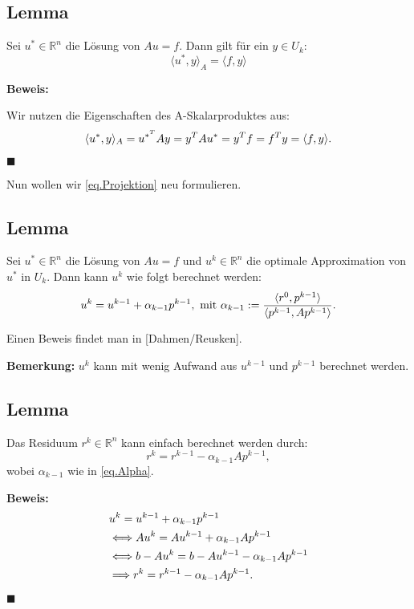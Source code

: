 \subsection{Lemma}
Sei $u^{*} \in \mathbb{R}^{n}$ die Lösung von $Au = f$. Dann gilt für ein $y \in U_{k}$:
\begin{equation}
\langle u^{*}, y \rangle _{A} = \langle f, y \rangle
\end{equation}

\textbf{Beweis:}

Wir nutzen die Eigenschaften des A-Skalarproduktes aus:
\begin{equation}
\langle u^{*}, y \rangle _{A} = u^{{*}^{T}}Ay = y^{T}Au^{*} = y^{T}f = f^{T}y = \langle f, y \rangle. \notag
\end{equation}
\begin{flushright}
$\blacksquare$
\end{flushright}

Nun wollen wir \autoref{eq.Projektion} neu formulieren.

\subsection{Lemma}
Sei $u^{*} \in \mathbb{R}^{n}$ die Lösung von $Au = f$ und $u^{k} \in \mathbb{R}^{n}$ die optimale Approximation von $u^{*}$ in $U_{k}$. Dann kann $u^{k}$ wie folgt berechnet werden:
\begin{equation}
u^{k} = u^{k-1} + \alpha_{k-1}p^{k-1}, \textnormal{ mit } \alpha_{k-1} := \frac {\langle r^{0}, p^{k-1} \rangle} {\langle {p^{k-1}, Ap^{k-1}} \rangle}. \notag\label{eq.Alpha}
\end{equation}

Einen Beweis findet man in [Dahmen/Reusken].

\textbf{Bemerkung:}
$u^{k}$ kann mit wenig Aufwand aus $u^{k-1}$ und $p^{k-1}$ berechnet werden.

\subsection{Lemma}
Das Residuum $r^{k} \in \mathbb{R}^{n}$ kann einfach berechnet werden durch:
\begin{equation}
r^{k} = r^{k-1} - \alpha_{k-1}Ap^{k-1},
\end{equation}
wobei $\alpha_{k-1}$ wie in \autoref{eq.Alpha}.

\textbf{Beweis:}
\begin{eqnarray}
&u^{k} = u^{k-1} + \alpha_{k-1}p^{k-1} \notag \\
&\Longleftrightarrow Au^{k} = Au^{k-1} + \alpha_{k-1}Ap^{k-1} \notag \\
&\Longleftrightarrow b - Au^{k} = b - Au^{k-1} - \alpha_{k-1}Ap^{k-1} \notag \\
&\Longrightarrow r^{k} = r^{k-1} - \alpha_{k-1}Ap^{k-1}. \notag
\end{eqnarray}
\begin{flushright}
$\blacksquare$
\end{flushright}

